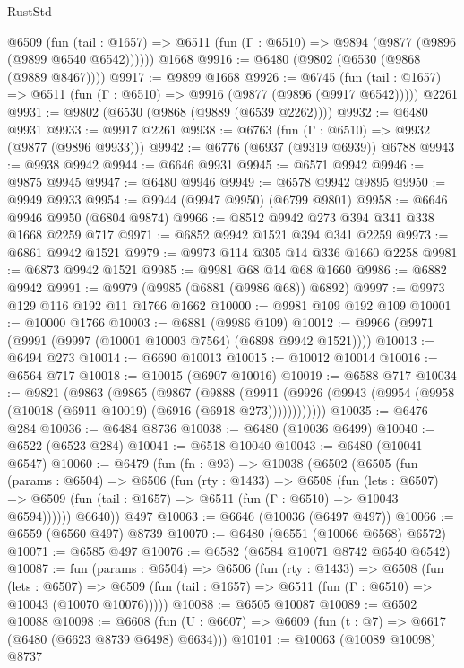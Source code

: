 \begin{lexlean}{RustStd}
\begin{coremodule}
    @6509
      (fun (tail : @1657) => @6511 (fun (Γ : @6510) => @9894 (@9877 (@9896 (@9899 @6540 @6542))))))
    @1668
@9916 := @6480 (@9802 (@6530 (@9868 (@9889 @8467))))
@9917 := @9899 @1668
@9926 := @6745
    (fun (tail : @1657) => @6511 (fun (Γ : @6510) => @9916 (@9877 (@9896 (@9917 @6542)))))
    @2261
@9931 := @9802 (@6530 (@9868 (@9889 (@6539 @2262))))
@9932 := @6480 @9931
@9933 := @9917 @2261
@9938 := @6763 (fun (Γ : @6510) => @9932 (@9877 (@9896 @9933)))
@9942 := @6776 (@6937 (@9319 @6939)) @6788
@9943 := @9938 @9942
@9944 := @6646 @9931
@9945 := @6571 @9942
@9946 := @9875 @9945
@9947 := @6480 @9946
@9949 := @6578 @9942 @9895
@9950 := @9949 @9933
@9954 := @9944 (@9947 @9950) (@6799 @9801)
@9958 := @6646 @9946 @9950 (@6804 @9874)
@9966 := @8512 @9942 @273 @394 @341 @338 @1668 @2259 @717
@9971 := @6852 @9942 @1521 @394 @341 @2259
@9973 := @6861 @9942 @1521
@9979 := @9973 @114 @305 @14 @336 @1660 @2258
@9981 := @6873 @9942 @1521
@9985 := @9981 @68 @14 @68 @1660
@9986 := @6882 @9942
@9991 := @9979 (@9985 (@6881 (@9986 @68)) @6892)
@9997 := @9973 @129 @116 @192 @11 @1766 @1662
@10000 := @9981 @109 @192 @109
@10001 := @10000 @1766
@10003 := @6881 (@9986 @109)
@10012 := @9966 (@9971 (@9991 (@9997 (@10001 @10003 @7564) (@6898 @9942 @1521))))
@10013 := @6494 @273
@10014 := @6690 @10013
@10015 := @10012 @10014
@10016 := @6564 @717
@10018 := @10015 (@6907 @10016)
@10019 := @6588 @717
@10034 := @9821
    (@9863
      (@9865
        (@9867
          (@9888
            (@9911 (@9926 (@9943 (@9954 (@9958 (@10018 (@6911 @10019) (@6916 (@6918 @273))))))))))))
@10035 := @6476 @284
@10036 := @6484 @8736
@10038 := @6480 (@10036 @6499)
@10040 := @6522 (@6523 @284)
@10041 := @6518 @10040
@10043 := @6480 (@10041 @6547)
@10060 := @6479
    (fun (fn : @93) =>
    @10038
      (@6502
        (@6505
          (fun (params : @6504) =>
          @6506
            (fun (rty : @1433) =>
            @6508
              (fun (lets : @6507) =>
              @6509 (fun (tail : @1657) => @6511 (fun (Γ : @6510) => @10043 @6594))))))
        @6640))
    @497
@10063 := @6646 (@10036 (@6497 @497))
@10066 := @6559 (@6560 @497) @8739
@10070 := @6480 (@6551 (@10066 @6568) @6572)
@10071 := @6585 @497
@10076 := @6582 (@6584 @10071 @8742 @6540 @6542)
@10087 := fun (params : @6504) =>
  @6506
    (fun (rty : @1433) =>
    @6508
      (fun (lets : @6507) =>
      @6509 (fun (tail : @1657) => @6511 (fun (Γ : @6510) => @10043 (@10070 @10076)))))
@10088 := @6505 @10087
@10089 := @6502 @10088
@10098 := @6608 (fun (U : @6607) => @6609 (fun (t : @7) => @6617 (@6480 (@6623 @8739 @6498) @6634)))
@10101 := @10063 (@10089 @10098) @8737

\end{coremodule}
\end{lexlean}
